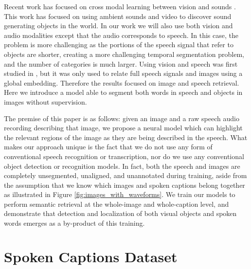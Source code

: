 Recent work has focused on cross modal learning between vision and sounds \cite{Owens16,Owens2016b,NIPS2016_6146,look_listen_learn}. This work has focused on using ambient sounds and video to discover sound generating objects in the world. In our work we will also use both vision and audio modalities except that the audio corresponds to speech. In this case, the problem is more challenging as the portions of the speech signal that refer to objects are shorter, creating a more challenging temporal segmentation problem, and the number of categories is much larger. Using vision and speech was first studied in \cite{harwath_nips}, but it was only used to relate full speech signals and images using a global embedding. Therefore the results focused on image and speech retrieval. Here we introduce a model able to segment both words in speech and objects in images without supervision. 

The premise of this paper is as follows: given an image and a raw speech audio recording describing that image, we propose a neural model which can highlight the relevant regions of the image as they are being described in the speech. What makes our approach unique is the fact that we do not use any form of conventional speech recognition or transcription, nor do we use any conventional object detection or recognition models. In fact, both the speech and images are completely unsegmented, unaligned, and unannotated during training, aside from the assumption that we know which images and spoken captions belong together as illustrated in Figure \ref{fig:images_with_waveforms}. We train our models to perform semantic retrieval at the whole-image and whole-caption level, and demonstrate that detection and localization of both visual objects and spoken words emerges as a by-product of this training.

\section{Spoken Captions Dataset}

